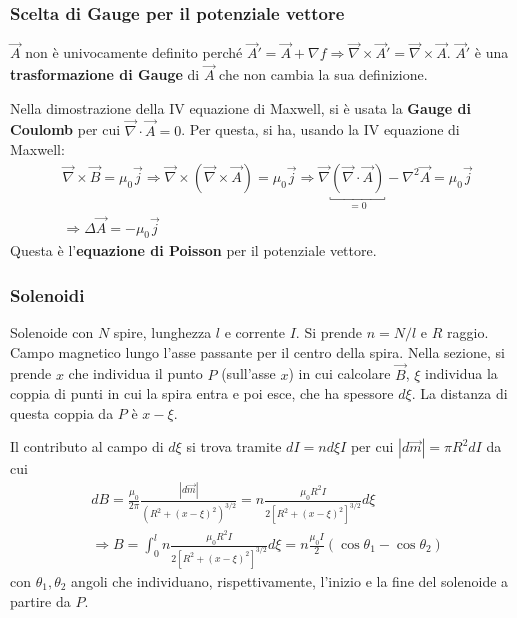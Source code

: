 \documentclass[10pt, a4paper]{scrartcl}
\numberwithin{equation}{subsection}
\theoremstyle{style1}
\begin{document}
\subsubsection{Scelta di Gauge per il potenziale vettore}
$\vec{A}$ non \`e univocamente definito perch\'e $\vec{A}' = \vec{A} + \nabla f \Rightarrow \vec{\nabla } \times \vec{A}' = \vec{\nabla }\times \vec{A}$. $\vec{A}'$ \`e una \textbf{trasformazione di Gauge} di $\vec{A}$ che non cambia la sua definizione. 

Nella dimostrazione della IV equazione di Maxwell, si \`e usata la \textbf{Gauge di Coulomb} per cui $\vec{\nabla }\cdot \vec{A} = 0$. Per questa, si ha, usando la IV equazione di Maxwell:
\begin{equation}
	\begin{split}
		&\vec{\nabla }\times \vec{B} =  \mu_0 \vec{j} \Rightarrow \vec{\nabla }\times  (\vec{\nabla }\times \vec{A}) = \mu_0 \vec{j} \Rightarrow \vec{\nabla }\underbracket{(\vec{\nabla }\cdot \vec{A})}_{=0}  - \nabla ^2 \vec{A} = \mu_0 \vec{j}\\
		&\Rightarrow \Delta \vec{A} = - \mu_0 \vec{j}
	\end{split}
\end{equation}
Questa \`e l'\textbf{equazione di Poisson} per il potenziale vettore. 
\subsubsection{Solenoidi}
Solenoide con $N$ spire, lunghezza $l$ e corrente $I$. Si prende $n = N / l$ e $R$ raggio. Campo magnetico lungo l'asse passante per il centro della spira. Nella sezione, si prende $x$ che individua il punto $P$ (sull'asse $x$) in cui calcolare $\vec{B}$, $\xi $ individua la coppia di punti in cui la spira entra e poi esce, che ha spessore $d\xi $. La distanza di questa coppia da $P$ \`e $x-\xi $.

Il contributo al campo di $d\xi $ si trova tramite $dI = n d\xi  I$ per cui $\left\lvert d\vec{m} \right\rvert = \pi R^2 dI$ da cui
\begin{equation}
	\begin{split}
		&dB  = \frac{\mu_0}{2\pi}\frac{\left\lvert d\vec{m} \right\rvert }{(R^2 + (x-\xi )^2)^{3 / 2} }=n \frac{\mu_0 R^2 I}{2 \left[ R^2 + (x-\xi )^2 \right] ^{3 / 2} } d\xi \\
		&\Rightarrow B = \int_{0} ^l n \frac{\mu_0 R^2 I }{2 \left[ R^2 + (x-\xi )^2 \right] ^{3 / 2} } d\xi = n \frac{\mu_0 I}{2}(\cos \theta_1 - \cos \theta_2)
	\end{split}
\end{equation}
con $\theta_1, \theta_2$ angoli che individuano, rispettivamente, l'inizio e la fine del solenoide a partire da $P$.
\end{document}

